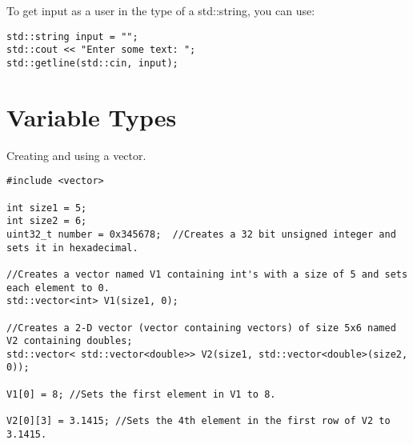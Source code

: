 To get input as a user in the type of a std::string, you can use:
\begin{lstlisting}
std::string input = "";
std::cout << "Enter some text: ";
std::getline(std::cin, input);
\end{lstlisting}






\section{Variable Types}

Creating and using a vector.
\begin{lstlisting}
#include <vector>

int size1 = 5;
int size2 = 6;
uint32_t number = 0x345678;  //Creates a 32 bit unsigned integer and sets it in hexadecimal.

//Creates a vector named V1 containing int's with a size of 5 and sets each element to 0. 
std::vector<int> V1(size1, 0); 

//Creates a 2-D vector (vector containing vectors) of size 5x6 named V2 containing doubles;
std::vector< std::vector<double>> V2(size1, std::vector<double>(size2, 0)); 

V1[0] = 8; //Sets the first element in V1 to 8.

V2[0][3] = 3.1415; //Sets the 4th element in the first row of V2 to 3.1415.
\end{lstlisting}






